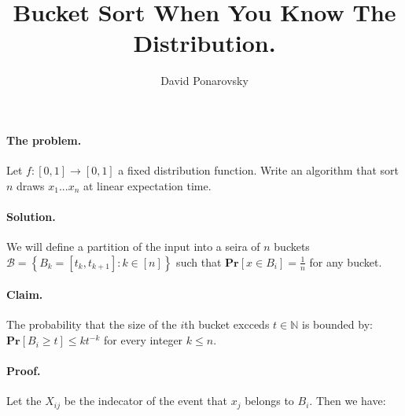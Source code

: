 \documentclass{article}
\newcommand{\prb}[1]{ \mathbf{Pr} \left[ {#1} \right]}
\newcommand{\expp}[1]{ \mathbf{E} \left[ {#1} \right]}
\newcommand{\xij} { X_{ij} }
\begin{document}
\title{Bucket Sort When You Know The Distribution.} 
\author{David Ponarovsky}
\maketitle
{} 
\begin{multicols*}{2}

  \paragraph{The problem.} Let $f: [0,1] \rightarrow [0,1]$ a fixed distribution function. Write an algorithm that sort $n$ draws $x_1 ... x_{n}$ at linear expectation time.  
  \paragraph{Solution.} We will define a partition of the input into a seira of $n$ buckets $\mathcal{B} = \left\{ B_{k} = [t_{k}, t_{k+1} ] : k \in [n]  \right\}$ such that $ \prb{ x \in B_{i}} = \frac{1}{n}$ for any bucket. 
  \paragraph{Claim.} The probability that the size of the $i$th bucket excceds $t \in \mathbb{N}$ is bounded by: $\prb{ B_{i} \ge t}  \le kt^{-k}$ for every integer $k \le n$.
  \paragraph{Proof.} Let the $\xij$ be the indecator of the event that $x_{j}$ belongs to $B_i$. Then we have:
 

\end{multicols*}
\end{document}
